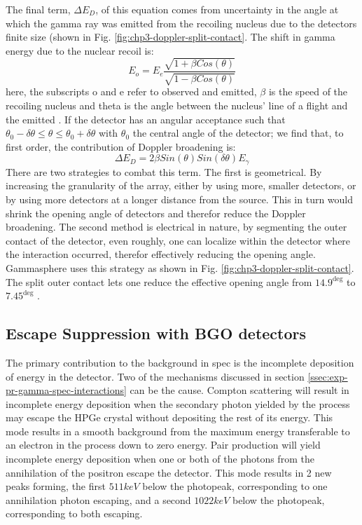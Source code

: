 The final term, $\Delta{}E_{D}$, of this equation comes from uncertainty in the angle at which the gamma ray was emitted from the recoiling nucleus due to the detectors finite size (shown in Fig. \ref{fig:chp3-doppler-split-contact}. The shift in gamma energy due to the nuclear recoil is:
\begin{equation}
\label{eqn:doppler_formula} 
E_{o} = E_{e}\frac{\sqrt{1+\beta{}Cos(\theta)}}{\sqrt{1-\beta{}Cos(\theta)}}
\end{equation}
here, the subscripts o and e refer to observed and emitted, $\beta$ is the speed of the recoiling nucleus and theta is the angle between the nucleus' line of a flight and the emitted \gr{}. If the detector has an angular acceptance such that $\theta{}_{0}-\delta{}\theta{}\leq{}\theta{}\leq{}\theta{}_{0}+\delta{}\theta{}$ with $\theta{}_{0}$ the central angle of the detector; we find that, to first order, the contribution of Doppler broadening is:
\begin{equation}
\label{eqn:res-doppler-term} 
\Delta{}E_{D} = 2\beta{}Sin(\theta{})Sin(\delta{}\theta{})E_{\gamma}
\end{equation}
There are two strategies to combat this term. The first is geometrical. By increasing the granularity of the array, either by using more, smaller detectors, or by using more detectors at a longer distance from the source. This in turn would shrink the opening angle of detectors and therefor reduce the Doppler broadening. The second method is electrical in nature, by segmenting the outer contact of the detector, even roughly, one can localize within the detector where the interaction occurred, therefor effectively reducing the opening angle. Gammasphere uses this strategy as shown in Fig. \ref{fig:chp3-doppler-split-contact}. The split outer contact lets one reduce the effective opening angle from $14.9^{\deg}$ to $7.45^{\deg}$ \cite{TheGS}.
\subsection{Escape Suppression with BGO detectors}
\label{ssec:exp-pr-gamma-spec-escape-supress}
The primary contribution to the background in \gr{} spec is the incomplete deposition of energy in the detector. Two of the mechanisms discussed in section \ref{ssec:exp-pr-gamma-spec-interactions} can be the cause. Compton scattering will result in incomplete energy deposition when the secondary photon yielded by the process may escape the HPGe crystal without depositing the rest of its energy. This mode results in a smooth background from the maximum energy transferable to an electron in the process down to zero energy. Pair production will yield incomplete energy deposition when one or both of the photons from the annihilation of the positron escape the detector. This mode results in 2 new peaks forming, the first $511keV$ below the photopeak, corresponding to one annihilation photon escaping, and a second $1022keV$ below the photopeak, corresponding to both escaping.

